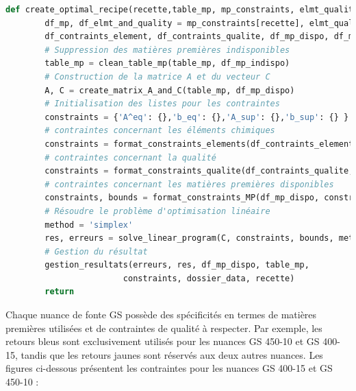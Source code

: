 \documentclass[12pt]{article}
\begin{document}
\begin{lstlisting}[language=Python, caption= Extrait de code générant une recette optimale ]
    def create_optimal_recipe(recette,table_mp, mp_constraints, elmt_quality_constraints,dossier_data):
        df_mp, df_elmt_and_quality = mp_constraints[recette], elmt_quality_constraints[recette]
        df_contraints_element, df_contraints_qualite, df_mp_dispo, df_mp_indispo = Separate_data(table_mp, df_mp, df_elmt_and_quality)
        # Suppression des matières premières indisponibles
        table_mp = clean_table_mp(table_mp, df_mp_indispo)
        # Construction de la matrice A et du vecteur C
        A, C = create_matrix_A_and_C(table_mp, df_mp_dispo)
        # Initialisation des listes pour les contraintes
        constraints = {'A^eq': {},'b_eq': {},'A_sup': {},'b_sup': {} }
        # contraintes concernant les éléments chimiques
        constraints = format_constraints_elements(df_contraints_element, A, constraints)
        # contraintes concernant la qualité
        constraints = format_constraints_qualite(df_contraints_qualite, A, constraints)
        # contraintes concernant les matières premières disponibles
        constraints, bounds = format_constraints_MP(df_mp_dispo, constraints)
        # Résoudre le problème d'optimisation linéaire
        method = 'simplex' 
        res, erreurs = solve_linear_program(C, constraints, bounds, method)
        # Gestion du résultat
        gestion_resultats(erreurs, res, df_mp_dispo, table_mp, 
                        constraints, dossier_data, recette)
        return
\end{lstlisting}
    


Chaque nuance de fonte GS possède des spécificités en termes de matières 
premières utilisées et de contraintes de qualité à respecter. 
Par exemple, les retours bleus sont 
exclusivement utilisés pour les nuances GS 450-10 et GS 400-15, 
tandis que les retours jaunes sont réservés aux deux autres nuances.
Les figures ci-dessous présentent les contraintes pour les nuances 
GS 400-15 et GS 450-10 :



\end{document}

